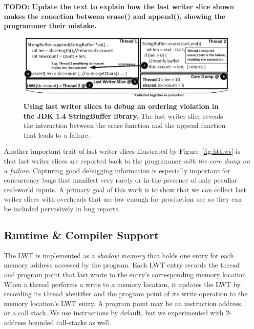 \documentclass[preprint,9pt]{sigplanconf}
\newcommand{\lwt}{LWT\xspace}
\begin{document}

{\bf TODO: Update the text to explain how the last writer slice shown makes the conection between erase() and append(), showing the programmer their mistake.}


\begin{figure}[h]
\centering
\includegraphics[width=\columnwidth]{figs/JDKStringBufferDebug2.pdf}
\caption{\label{fig:jdklws}{\bf Using last writer slices to debug an
ordering violation in the JDK 1.4 StringBuffer library.} The last writer slice reveals the interaction between the erase function and the append function that leads to a failure.}
\end{figure}


Another important trait of last writer slices illustrated by
Figure~\ref{fig:httlws} is that last writer slices are reported back to the
programmer {\em with the core dump on a failure}.  Capturing good debugging
information is especially important for concurrency bugs that manifest very
rarely or in the presence of only peculiar real-world inputs.  A primary goal
of this work is to show that we can collect last writer slices with overheads
that are low enough for production use so they can be included pervasively in
bug reports.


\subsection{Runtime \& Compiler Support}
 The \lwt is implemented as a {\em shadow memory} that holds one entry for
each memory address accessed by the program.  Each \lwt entry records the
thread and program point that last wrote to the entry's corresponding memory
location.  When a thread performs a write to a memory location, it updates the
\lwt by recording its thread identifier and the program point of its write
operation to the memory location's \lwt entry.  A program point may be an
instruction address, or a call stack.  We use instructions by default, but we experimented with 2-address bounded call-stacks as well.   
\end{document}
